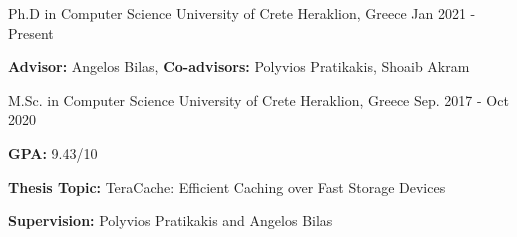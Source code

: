
\begin{cventries}

  \cventry
    {Ph.D in Computer Science} %
    {University of Crete} %
    {Heraklion, Greece} %
    {Jan 2021 - Present} %
    {
      \begin{cvitems} %
	  \item{\textbf{Advisor:} Angelos Bilas, \textbf{Co-advisors:} Polyvios Pratikakis, Shoaib Akram}
      \end{cvitems}
    }
  \cventry
    {M.Sc. in Computer Science} %
    {University of Crete} %
    {Heraklion, Greece} %
    {Sep. 2017 - Oct 2020} %
    {
      \begin{cvitems} %
      \item{\textbf{GPA:} 9.43/10}
      \item{\textbf{Thesis Topic:} 
         TeraCache: Efficient Caching over Fast Storage Devices}
        \item{\textbf{Supervision:} Polyvios Pratikakis and Angelos Bilas}
      \end{cvitems}
    }


\end{cventries}
